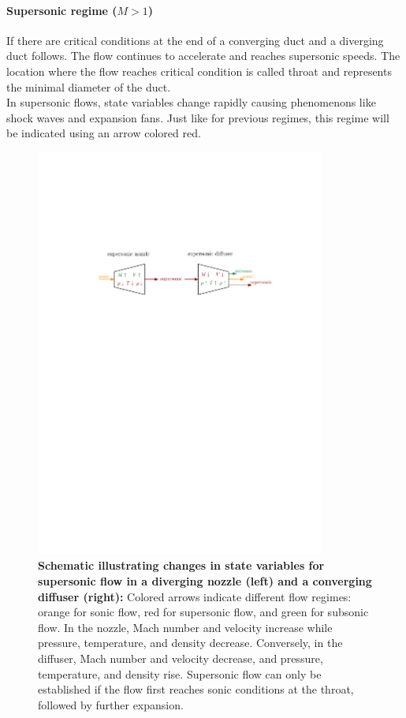 	\paragraph{Supersonic regime ($M > 1$)}
		If there are critical conditions at the end of a converging duct and a diverging duct follows.
		The flow continues to accelerate and reaches supersonic speeds.
		The location where the flow reaches critical condition is called throat and represents the minimal diameter of the duct.\\
		In supersonic flows, state variables change rapidly causing phenomenons like shock waves and expansion fans.
		Just like for previous regimes, this regime will be indicated using an arrow colored red.
		\cite{Cantwell_AA210A}
		\newpage
		\begin{figure}[H]
		    \centering
		    \includegraphics[width=0.85\textwidth]{src/02_foundations/fig_variable-change-supersonic.pdf}
			\caption[Schematic illustrating changes in state variables for supersonic flow in a diverging nozzle (left) and a converging diffuser (right).]{
				\textbf{Schematic illustrating changes in state variables for supersonic flow in a diverging nozzle (left) and a converging diffuser (right):}
				Colored arrows indicate different flow regimes: orange for sonic flow, red for supersonic flow, and green for subsonic flow.
				In the nozzle, Mach number and velocity increase while pressure, temperature, and density decrease.
				Conversely, in the diffuser, Mach number and velocity decrease, and pressure, temperature, and density rise.
				Supersonic flow can only be established if the flow first reaches sonic conditions at the throat, followed by further expansion.
				\cite{Cengel2017}
			}
		\end{figure}
